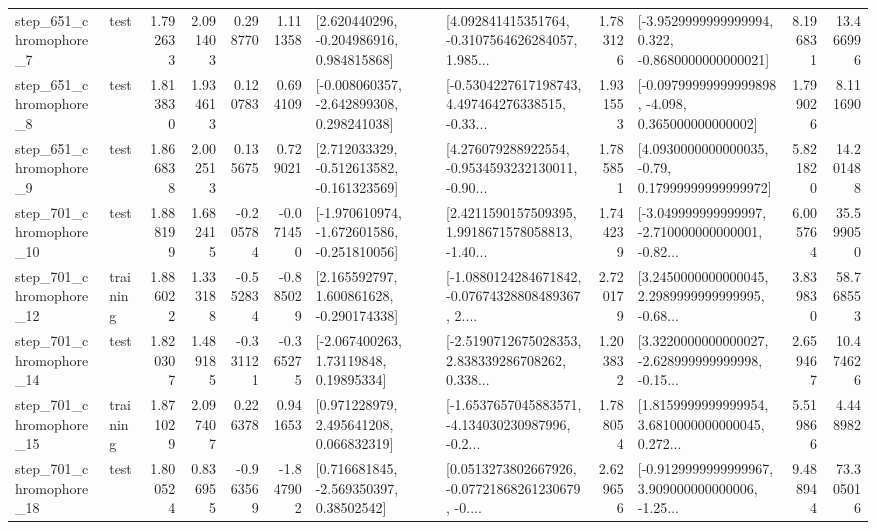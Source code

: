 \begin{tabular}{llrrrrllrlrr}
   step\_651\_chromophore\_7 &      test &      1.792633 &    2.091403 &      0.298770 &  1.111358 &    [2.620440296, -0.204986916, 0.984815868] &  [4.092841415351764, -0.3107564626284057, 1.985... &       1.783126 &  [-3.9529999999999994, 0.322, -0.8680000000000021] &            8.196831 &         13.466996 \\
   step\_651\_chromophore\_8 &      test &      1.813830 &    1.934613 &      0.120783 &  0.694109 &   [-0.008060357, -2.642899308, 0.298241038] &  [-0.5304227617198743, 4.497464276338515, -0.33... &       1.931553 &  [-0.09799999999999898, -4.098, 0.365000000000002] &            1.799026 &          8.111690 \\
   step\_651\_chromophore\_9 &      test &      1.866838 &    2.002513 &      0.135675 &  0.729021 &   [2.712033329, -0.512613582, -0.161323569] &  [4.276079288922554, -0.9534593232130011, -0.90... &       1.785851 &   [4.0930000000000035, -0.79, 0.17999999999999972] &            5.821820 &         14.201488 \\
  step\_701\_chromophore\_10 &      test &      1.888199 &    1.682415 &     -0.205784 & -0.071450 &  [-1.970610974, -1.672601586, -0.251810056] &  [2.4211590157509395, 1.9918671578058813, -1.40... &       1.744239 &  [-3.049999999999997, -2.710000000000001, -0.82... &            6.005764 &         35.599050 \\
  step\_701\_chromophore\_12 &  training &      1.886022 &    1.333188 &     -0.552834 & -0.885029 &    [2.165592797, 1.600861628, -0.290174338] &  [-1.0880124284671842, -0.07674328808489367, 2.... &       2.720179 &  [3.2450000000000045, 2.2989999999999995, -0.68... &            3.839830 &         58.768553 \\
  step\_701\_chromophore\_14 &      test &      1.820307 &    1.489185 &     -0.331121 & -0.365275 &      [-2.067400263, 1.73119848, 0.19895334] &  [-2.5190712675028353, 2.838339286708262, 0.338... &       1.203832 &  [3.3220000000000027, -2.628999999999998, -0.15... &            2.659467 &         10.474626 \\
  step\_701\_chromophore\_15 &  training &      1.871029 &    2.097407 &      0.226378 &  0.941653 &     [0.971228979, 2.495641208, 0.066832319] &  [-1.6537657045883571, -4.134030230987996, -0.2... &       1.788054 &  [1.8159999999999954, 3.6810000000000045, 0.272... &            5.519866 &          4.448982 \\
  step\_701\_chromophore\_18 &      test &      1.800524 &    0.836955 &     -0.963569 & -1.847902 &     [0.716681845, -2.569350397, 0.38502542] &  [0.0513273802667926, -0.07721868261230679, -0.... &       2.629656 &  [-0.9129999999999967, 3.909000000000006, -1.25... &            9.488944 &         73.305016 \\

\end{tabular}
